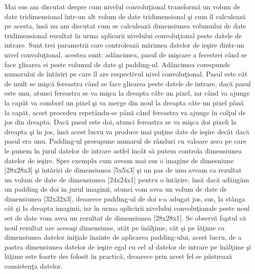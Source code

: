 Mai sus am discutat despre cum nivelul convolu\c{t}ional transform\u{a} un volum de date tridimensional \^{i}ntr-un alt volum de date tridimensional \c{s}i cum \^{i}l calculeaz\u{a} pe acesta, \^{i}ns\u{a} nu am discutat cum se calculeaz\u{a} dimensiunea volumului de date tridimensional rezultat \^{i}n urma aplicarii nivelului convolu\c{t}ional peste  datele de intrare. Sunt trei parametrii care controleaz\u{a} m\u{a}rimea datelor de ie\c{s}ire dintr-un nivel convolu\c{t}ional, acestea sunt: ad\^{a}ncimea, pasul de mi\c{s}care a ferestrei c\^{a}nd se face glisarea ei peste volumul de date \c{s}i padding-ul. Ad\^{a}ncimea corespunde numarului de \^{i}nt\u{a}riri pe care \^{i}l are respectivul nivel convolu\c{t}ional. Pasul este c\^{a}t de mult se mi\c{s}c\u{a} fereastra c\^{a}nd se face glisarea peste datele de intrare, dac\u{a} pasul este unu, atunci fereastra se va mi\c{s}ca la dreapta c\^{a}te un pixel, iar c\^{a}nd va ajunge la cap\u{a}t va combor\^{i} un pixel \c{s}i va merge din noul la dreapta c\^{a}te un pixel p\^{a}n\u{a} la cap\u{a}t, acest procedeu repet\^{a}ndu-se p\^{a}n\u{a} c\^{a}nd fereastra va ajunge \^{i}n col\c{t}ul de jos din dreapta. Dac\u{a} pasul este doi, atunci fereastra se va mi\c{s}ca doi pixeli la dreapta \c{s}i \^{i}n jos, \^{i}ns\u{a} acest lucru va produce mai pu\c{t}ine date de ie\c{s}ire dec\^{a}t dac\u{a} pasul era unu. Padding-ul presupune numarul de r\^{a}nduri cu valoare zero pe care le punem \^{i}n jurul datelor de intrare astfel \^{i}nc\^{a}t s\u{a} putem controla dimensiunea datelor de ie\c{s}ire. Spre exemplu cum aveam mai sus o imagine de dimesniune [28x28x3] \c{s}i \^{i}nt\u{a}riri de dimensiunea [5x5x3] \c{s}i un pas de unu aveam ca rezultat un volum de date de dimensiunea [24x24x1] pentru o \^{i}nt\u{a}rire, \^{i}ns\u{a} dac\u{a} ad\u{a}ug\u{a}m un padding de doi in jurul imaginii, atunci vom avea un volum de date de dimensiunea [32x32x3], deoarece padding-ul de doi s-a adugat jos, sus, la st\^{a}nga c\^{a}t \c{s}i la dreapta imaginii, iar \^{i}n urma aplic\u{a}rii nivelului convolu\c{t}ionale peste noul set de date vom avea un rezultat de dimensiunea [28x28x1]. Se observ\u{a} faptul c\u{a} noul rezultat are aceea\c{s}i dimensiune, at\^{a}t pe \^{i}n\u{a}l\c{t}ime, c\^{a}t \c{s}i pe l\u{a}\c{t}ime ca dimensiunea datelor ini\c{t}iale \^{i}nainte de aplicarea padding-ului, acest lucru,  de a pastra dimensiunea datelor de ie\c{s}ire egal cu cel al datelor de intrare pe \^{i}n\u{a}l\c{t}ime \c{s}i l\u{a}\c{t}ime este foarte des folosit \^{i}n practic\u{a}, deoarece prin acest fel se p\u{a}streaz\u{a} consisten\c{t}a datelor.


